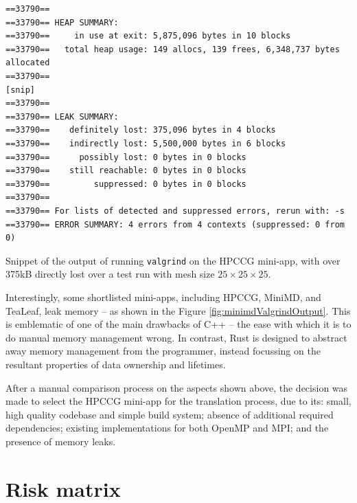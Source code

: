 \begin{code}
    \begin{verbatim}
==33790== 
==33790== HEAP SUMMARY:
==33790==     in use at exit: 5,875,096 bytes in 10 blocks
==33790==   total heap usage: 149 allocs, 139 frees, 6,348,737 bytes allocated
==33790== 
[snip]
==33790== 
==33790== LEAK SUMMARY:
==33790==    definitely lost: 375,096 bytes in 4 blocks
==33790==    indirectly lost: 5,500,000 bytes in 6 blocks
==33790==      possibly lost: 0 bytes in 0 blocks
==33790==    still reachable: 0 bytes in 0 blocks
==33790==         suppressed: 0 bytes in 0 blocks
==33790== 
==33790== For lists of detected and suppressed errors, rerun with: -s
==33790== ERROR SUMMARY: 4 errors from 4 contexts (suppressed: 0 from 0)
    \end{verbatim}
    \caption{Snippet of the output of running \texttt{valgrind} on the HPCCG mini-app, with over 375kB directly lost over a test run with mesh size $25 \times 25 \times 25$.}
    \label{fig:minimdValgrindOutput}
\end{code}

Interestingly, some shortlisted mini-apps, including HPCCG, MiniMD, and TeaLeaf, leak memory -- as shown in the Figure \ref{fig:minimdValgrindOutput}. This is emblematic of one of the main drawbacks of C++ -- the ease with which it is to do manual memory management wrong. In contrast, Rust is designed to abstract away memory management from the programmer, instead focussing on the resultant properties of data ownership and lifetimes.

After a manual comparison process on the aspects shown above, the decision was made to select the HPCCG mini-app for the translation process, due to its: small, high quality codebase and simple build system; absence of additional required dependencies; existing implementations for both OpenMP and MPI; and the presence of memory leaks.

\section{Risk matrix}
\label{sec:risk-matrix-appendix}


